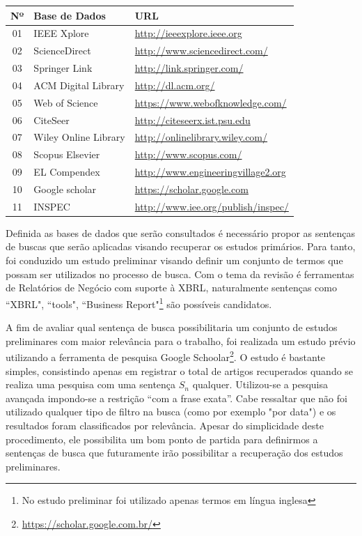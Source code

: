 \documentclass{article}
\begin{document}
\begin{center}
\begin{tabular}{cll}
\label{tab:base-dados}
 Nº&Base de Dados&URL\\
\hline
01 & IEEE Xplore  & \url{http://ieeexplore.ieee.org}\\
02 & ScienceDirect  & \url{http://www.sciencedirect.com/}\\
03 & Springer Link & \url{http://link.springer.com/}\\
04 & ACM Digital Library & \url{http://dl.acm.org/}\\
05 & Web of Science & \url{https://www.webofknowledge.com/}\\
06 & CiteSeer & \url{http://citeseerx.ist.psu.edu}\\
07 & Wiley Online Library & \url{http://onlinelibrary.wiley.com/}\\
08 & Scopus Elsevier & \url{http://www.scopus.com/}\\
09 & EL Compendex & \url{http://www.engineeringvillage2.org}\\
10 & Google scholar & \url{https://scholar.google.com}\\
11 &INSPEC  & \url{http://www.iee.org/publish/inspec/}\\
\end{tabular}
\end{center}


Definida as bases de dados que serão consultados é necessário propor as sentenças de buscas que serão aplicadas visando recuperar os estudos primários. Para tanto, foi conduzido um estudo preliminar visando definir um conjunto de termos que possam ser utilizados no processo de busca. Com o tema da revisão é ferramentas de Relatórios de Negócio com suporte à XBRL, naturalmente sentenças como ``XBRL", ``tools", ``Business Report"\footnote{No estudo preliminar foi utilizado apenas termos em língua inglesa} são possíveis candidatos.

A fim de avaliar qual sentença de busca possibilitaria um conjunto de estudos
preliminares com maior relevância para o trabalho, foi realizada um estudo
prévio utilizando a ferramenta de pesquisa Google
Schoolar\footnote{\url{https://scholar.google.com.br/}}. O estudo é bastante
simples, consistindo apenas em registrar o total de artigos recuperados quando
se realiza uma pesquisa com uma sentença $S_n$ qualquer. Utilizou-se a pesquisa
avançada impondo-se a restrição ``com a frase exata''. Cabe ressaltar que não foi utilizado qualquer tipo de filtro na busca (como por exemplo "por data") e os resultados foram classificados por relevância. Apesar do simplicidade deste procedimento, ele possibilita um bom ponto de partida para definirmos a sentenças de busca que futuramente irão possibilitar a recuperação dos estudos preliminares.
\end{document}
